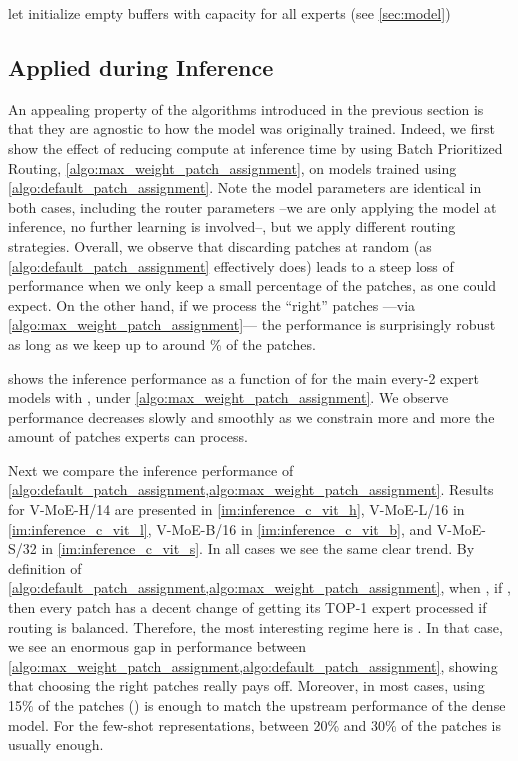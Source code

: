 \documentclass{article}
\newcommand{\abbv}{{V-MoE}}
\newcommand{\maxrouting}{Batch Prioritized Routing}
\begin{document}
\begin{algorithm}[H]
\SetAlgoLined
{}
 let \;
 initialize empty buffers with capacity  for all experts  (see \cref{sec:model})\;
 \;
 \;
 \caption{Skip-Patch Routing Allocation}
 \label{algo:skip_patch_assignment}
\end{algorithm}



\subsection{Applied during Inference}

An appealing property of the algorithms introduced in the previous section is that they are agnostic to how the model was originally trained.
Indeed, we first show the effect of reducing compute at inference time by using \maxrouting{}, \cref{algo:max_weight_patch_assignment}, on models trained using \cref{algo:default_patch_assignment}.
Note the model parameters are identical in both cases, including the router parameters --we are only applying the model at inference, no further learning is involved--, but we apply different routing strategies.
Overall, we observe that discarding patches at random (as \cref{algo:default_patch_assignment} effectively does) leads to a steep loss of performance when we only keep a small percentage of the patches, as one could expect.
On the other hand, if we process the ``right'' patches ---via \cref{algo:max_weight_patch_assignment}--- the performance is surprisingly robust as long as we keep up to around \% of the patches.


 shows the inference performance as a function of  for the main every-2 expert models with , under \cref{algo:max_weight_patch_assignment}.
We observe performance decreases slowly and smoothly as we constrain more and more the amount of patches experts can process.

Next we compare the inference performance of \cref{algo:default_patch_assignment,algo:max_weight_patch_assignment}.
Results for \abbv{}-H/14 are presented in \cref{im:inference_c_vit_h}, \abbv{}-L/16 in \cref{im:inference_c_vit_l}, \abbv{}-B/16 in \cref{im:inference_c_vit_b}, and \abbv{}-S/32 in \cref{im:inference_c_vit_s}.
In all cases we see the same clear trend.
By definition of \cref{algo:default_patch_assignment,algo:max_weight_patch_assignment}, when , if , then every patch has a decent change of getting its TOP-1 expert processed if routing is balanced.
Therefore, the most interesting regime here is .
In that case, we see an enormous gap in performance between \cref{algo:max_weight_patch_assignment,algo:default_patch_assignment}, showing that choosing the right patches really pays off.
Moreover, in most cases, using 15\% of the patches () is enough to match the upstream performance of the dense model.
For the few-shot representations, between 20\% and 30\% of the patches is usually enough.
\end{document}
